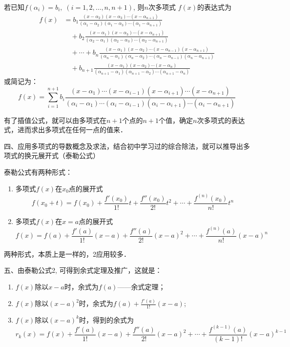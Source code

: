 若已知$f(\alpha_i)=b_i,\; (i=1,2,\ldots,n,n+1)$, 则$n$次多项式
$f(x)$的表达式为
\[\begin{split}
f(x)&=b_1\frac{(x-\alpha_2)(x-\alpha_{3})\cdots (x-\alpha_{n+1})}{(\alpha_1-\alpha_2)(\alpha_1-\alpha_3)\cdots (\alpha_1-\alpha_{n+1})}\\
&\quad +b_2\frac{(x-\alpha_1)(x-\alpha_{3})\cdots (x-\alpha_{n+1})}{(\alpha_2-\alpha_1)(\alpha_2-\alpha_3)\cdots (\alpha_2-\alpha_{n+1})}\\
&\quad +\cdots +b_n\frac{(x-\alpha_1)(x-\alpha_{2})\cdots (x-\alpha_{n-1})(x-\alpha_{n+1})}{(\alpha_n-\alpha_1)(\alpha_n-\alpha_2)\cdots (\alpha_n-\alpha_{n-1})(\alpha_n-\alpha_{n+1})}\\
&\quad +b_{n+1}\frac{(x-\alpha_1)(x-\alpha_{2})\cdots (x-\alpha_{n})}{(\alpha_{n+1}-\alpha_1)(\alpha_{n+1}-\alpha_2)\cdots (\alpha_{n+1}-\alpha_{n})}
\end{split}\]
或简记为：
\[f(x)=\sum^{n+1}_{i=1} b_i\frac{(x-\alpha_1)\cdots(x-\alpha_{i-1}) (x-\alpha_{i+1})\cdots(x-\alpha_{n+1})}{(\alpha_i-\alpha_1)\cdots(\alpha_i-\alpha_{i-1}) (\alpha_i-\alpha_{i+1})\cdots(\alpha_i-\alpha_{n+1})}\]

有了插值公式，就可以由多项式在$n+1$个点的$n+1$个值，确定$n$次多项式的表达式，进而求出多项式在任何一点的值来．

四、应用多项式的导数概念及求法，结合初中学习过的综合除法，就可以推导出多项式的换元展开式（泰勒公式）

泰勒公式有两种形式：
\begin{enumerate}
    \item 多项式$f(x)$在$x_0$点的展开式
    \[f(x_0+t)=f(x_0)+\frac{f'(x_0)}{1!}t+\frac{f''(x_0)}{2!}t^2+\cdots+\frac{f^{(n)}(x_0)}{n!}t^n\]
    \item 多项式$f(x)$在$x=a$点的展开式
    \[f(x)=f(a)+\frac{f'(a)}{1!}(x-a)+\frac{f''(a)}{2!}(x-a)^2+\cdots+\frac{f^{(n)}(a)}{n!}(x-a)^n\]
\end{enumerate}
两种形式，本质上是一样的，2应用较多．

五、由泰勒公式2, 可得到余式定理及推广，这就是：
\begin{enumerate}
    \item $f(x)$除以$x-a$时，余式为$f(a)$——余式定理；
    \item $f(x)$除以$(x-a)^2$时，余式为$f(a)+\frac{f'(a)}{1!}(x-a)$;
    \item $f(x)$除以$(x-a)^k$时，得到的余式为
    \[r_k (x) =f (x) +\frac{f'(a)}{1!}(x-a)+\frac{f''(a)}{2!}(x-a)^2+\cdots +\frac{f^{(k-1)}(a)}{(k-1)!}(x-a)^{k-1}\]
\end{enumerate}


